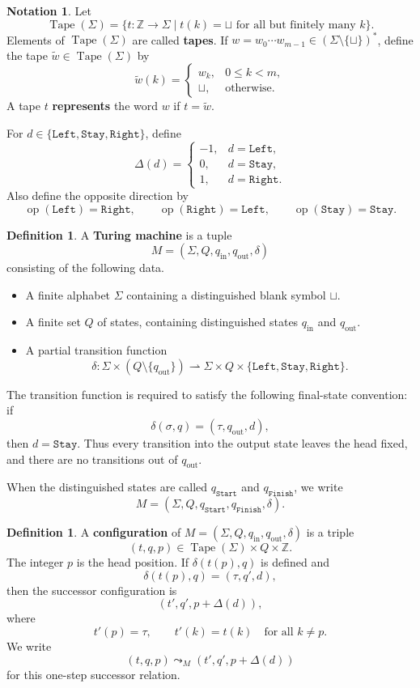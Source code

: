 \documentclass[12pt]{article}
\theoremstyle{plain}
\theoremstyle{definition}
\newtheorem{defn}[thm]{Definition}
\newtheorem{notation}[thm]{Notation}
\newcommand{\bb}[1]{\mathbb{#1}}
\newcommand{\blank}{\sqcup}
\newcommand{\Dir}{\{\texttt{Left},\texttt{Stay},\texttt{Right}\}}
\newcommand{\Start}{q_{\texttt{Start}}}
\newcommand{\Finish}{q_{\texttt{Finish}}}
\newcommand{\op}{\operatorname{op}}
\DeclareMathOperator{\Tape}{Tape}
\begin{document}
\begin{notation}\label{not:tapes}
Let
\[
\Tape(\Sigma)=\{t:\bb Z\to\Sigma\mid t(k)=\blank\text{ for all but finitely many }k\}.
\]
Elements of $\Tape(\Sigma)$ are called \textbf{tapes}. If $w=w_0\cdots w_{m-1}\in(\Sigma\setminus\{\blank\})^\ast$, define the tape $\widetilde w\in\Tape(\Sigma)$ by
\[
\widetilde w(k)=
\begin{cases}
w_k,&0\leq k<m,\\
\blank,&\text{otherwise.}
\end{cases}
\]
A tape $t$ \textbf{represents} the word $w$ if $t=\widetilde w$.

For $d\in\Dir$, define
\[
\Delta(d)=
\begin{cases}
-1,&d=\texttt{Left},\\
0,&d=\texttt{Stay},\\
1,&d=\texttt{Right}.
\end{cases}
\]
Also define the opposite direction by
\[
\op(\texttt{Left})=\texttt{Right},\qquad
\op(\texttt{Right})=\texttt{Left},\qquad
\op(\texttt{Stay})=\texttt{Stay}.
\]
\end{notation}

\begin{defn}\label{def:Turing_machine}
A \textbf{Turing machine} is a tuple
\[
M=(\Sigma,Q,q_{\mathrm{in}},q_{\mathrm{out}},\delta)
\]
consisting of the following data.
\begin{itemize}
\item A finite alphabet $\Sigma$ containing a distinguished blank symbol $\blank$.
\item A finite set $Q$ of states, containing distinguished states $q_{\mathrm{in}}$ and $q_{\mathrm{out}}$.
\item A partial transition function
\[
\delta:\Sigma\times(Q\setminus\{q_{\mathrm{out}}\})\rightharpoonup \Sigma\times Q\times\Dir.
\]
\end{itemize}
The transition function is required to satisfy the following final-state convention: if
\[
\delta(\sigma,q)=(\tau,q_{\mathrm{out}},d),
\]
then $d=\texttt{Stay}$. Thus every transition into the output state leaves the head fixed, and there are no transitions out of $q_{\mathrm{out}}$.

When the distinguished states are called $\Start$ and $\Finish$, we write
\[
M=(\Sigma,Q,\Start,\Finish,\delta).
\]
\end{defn}

\begin{defn}\label{def:configuration}
A \textbf{configuration} of $M=(\Sigma,Q,q_{\mathrm{in}},q_{\mathrm{out}},\delta)$ is a triple
\[
(t,q,p)\in\Tape(\Sigma)\times Q\times\bb Z.
\]
The integer $p$ is the head position. If $\delta(t(p),q)$ is defined and
\[
\delta(t(p),q)=(\tau,q',d),
\]
then the successor configuration is
\[
(t',q',p+\Delta(d)),
\]
where
\[
t'(p)=\tau,
\qquad
 t'(k)=t(k)\quad\text{for all }k\neq p.
\]
We write
\[
(t,q,p)\leadsto_M(t',q',p+\Delta(d))
\]
for this one-step successor relation.
\end{defn}
\end{document}
